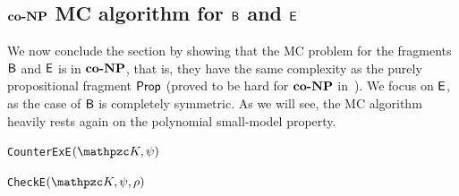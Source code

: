 \subsection{$\textbf{co-}\textbf{NP}$ MC algorithm for $\mathsf{B}$ and $\mathsf{E}$}\label{sec:TheFragmentE}
We now conclude the section by showing that the MC problem for the  fragments $\mathsf{B}$ and $\mathsf{E}$ is in $\textbf{co-}\textbf{NP}$, that is, they have the same complexity as the purely propositional fragment $\mathsf{Prop}$ (proved to be hard for $\textbf{co-}\textbf{NP}$ in~\cite{MMP15B}). We focus on $\mathsf{E}$, as the case  of  $\mathsf{B}$ is completely symmetric. As we will see, the MC algorithm heavily rests again on the polynomial small-model property. 

\begin{algorithm}[tp]
\begin{algorithmic}[1]
	\Else
	\EndIf
\end{algorithmic}
\caption{\texttt{CounterExE}$(\Ku,\psi)$}\label{ModCheckE}
\end{algorithm}


\begin{algorithm}[tp]
\begin{algorithmic}[1]
        \EndFor
        \EndFor


        \EndFor
	    \EndFor
	\EndIf
\EndFor	
{}
\end{algorithmic}
\caption{\texttt{CheckE}$(\Ku,\psi,\rho)$}\label{ChkE}
\end{algorithm}

